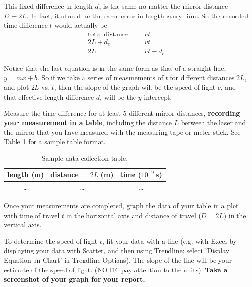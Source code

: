 This fixed difference in length $d_e$ is the same no matter the mirror distance $D=2L$. In fact, it should be the same error in length every time. So the recorded time difference $t$ would actually be 
\begin{eqnarray}
\textrm{total distance} &=& vt \\
2L + d_e &=& v t \\
2L &=& v t - d_e
\end{eqnarray}

Notice that the last equation is in the same form as that of a straight line, $y = mx + b$. So if we take a series of measurements of $t$ for different distances $2L$, and plot $2L$ vs. $t$, then the slope of the graph will be the speed of light $v$, and that effective length difference $d_e$ will be the $y$-intercept.

\begin{steps}

	\item Measure the time difference for at least 5 different mirror distances, \textbf{recording your measurement in a table}, including the distance $L$ between the laser and the mirror that you have measured with the measuring tape or meter stick. See Table \ref{sol:tab:data} for a sample table format.

\begin{table}
	\centering
	\begin{tabular}{|c|c|c|}
		\toprule
		length (m) & distance $= 2L$ (m) & time ($10^{-9}\:$s) \\
		\midrule
		\ldots & \ldots & \ldots \\
		\bottomrule
	\end{tabular}
	\caption{Sample data collection table.}\label{sol:tab:data}
\end{table}

	\item Once your measurements are completed, graph the data of your table in a plot with time of travel $t$ in the horizontal axis and distance of travel ($D = 2L$) in the vertical axis.
	
	\item To determine the speed of light $c$, fit your data with a line (e.g. with Excel by displaying your data with Scatter, and then using Trendline;  select 'Display Equation on Chart' in Trendline Options). The slope of the line will be your estimate of the speed of light. (NOTE: pay attention to the units). \textbf{Take a screenshot of your graph for your report.}
	
\end{steps}
	
